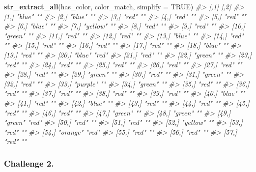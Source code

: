 \documentclass[
]{book}
\newenvironment{Shaded}{\begin{snugshade}}{\end{snugshade}}
\newcommand{\CommentTok}[1]{\textcolor[rgb]{0.56,0.35,0.01}{\textit{#1}}}
\newcommand{\DataTypeTok}[1]{\textcolor[rgb]{0.13,0.29,0.53}{#1}}
\newcommand{\KeywordTok}[1]{\textcolor[rgb]{0.13,0.29,0.53}{\textbf{#1}}}
\newcommand{\NormalTok}[1]{#1}
\newcommand{\OtherTok}[1]{\textcolor[rgb]{0.56,0.35,0.01}{#1}}
\begin{document}
\begin{Shaded}
\begin{Highlighting}[]
\KeywordTok{str_extract_all}\NormalTok{(has_color, color_match, }\DataTypeTok{simplify =} \OtherTok{TRUE}\NormalTok{)}
\CommentTok{#>       [,1]     [,2] }
\CommentTok{#>  [1,] "blue"   ""   }
\CommentTok{#>  [2,] "blue"   ""   }
\CommentTok{#>  [3,] "red"    ""   }
\CommentTok{#>  [4,] "red"    ""   }
\CommentTok{#>  [5,] "red"    ""   }
\CommentTok{#>  [6,] "blue"   ""   }
\CommentTok{#>  [7,] "yellow" ""   }
\CommentTok{#>  [8,] "red"    ""   }
\CommentTok{#>  [9,] "red"    ""   }
\CommentTok{#> [10,] "green"  ""   }
\CommentTok{#> [11,] "red"    ""   }
\CommentTok{#> [12,] "red"    ""   }
\CommentTok{#> [13,] "blue"   ""   }
\CommentTok{#> [14,] "red"    ""   }
\CommentTok{#> [15,] "red"    ""   }
\CommentTok{#> [16,] "red"    ""   }
\CommentTok{#> [17,] "red"    ""   }
\CommentTok{#> [18,] "blue"   ""   }
\CommentTok{#> [19,] "red"    ""   }
\CommentTok{#> [20,] "blue"   "red"}
\CommentTok{#> [21,] "red"    ""   }
\CommentTok{#> [22,] "green"  ""   }
\CommentTok{#> [23,] "red"    ""   }
\CommentTok{#> [24,] "red"    ""   }
\CommentTok{#> [25,] "red"    ""   }
\CommentTok{#> [26,] "red"    ""   }
\CommentTok{#> [27,] "red"    ""   }
\CommentTok{#> [28,] "red"    ""   }
\CommentTok{#> [29,] "green"  ""   }
\CommentTok{#> [30,] "red"    ""   }
\CommentTok{#> [31,] "green"  ""   }
\CommentTok{#> [32,] "red"    ""   }
\CommentTok{#> [33,] "purple" ""   }
\CommentTok{#> [34,] "green"  ""   }
\CommentTok{#> [35,] "red"    ""   }
\CommentTok{#> [36,] "red"    ""   }
\CommentTok{#> [37,] "red"    ""   }
\CommentTok{#> [38,] "red"    ""   }
\CommentTok{#> [39,] "red"    ""   }
\CommentTok{#> [40,] "blue"   ""   }
\CommentTok{#> [41,] "red"    ""   }
\CommentTok{#> [42,] "blue"   ""   }
\CommentTok{#> [43,] "red"    ""   }
\CommentTok{#> [44,] "red"    ""   }
\CommentTok{#> [45,] "red"    ""   }
\CommentTok{#> [46,] "red"    ""   }
\CommentTok{#> [47,] "green"  ""   }
\CommentTok{#> [48,] "green"  ""   }
\CommentTok{#> [49,] "green"  "red"}
\CommentTok{#> [50,] "red"    ""   }
\CommentTok{#> [51,] "red"    ""   }
\CommentTok{#> [52,] "yellow" ""   }
\CommentTok{#> [53,] "red"    ""   }
\CommentTok{#> [54,] "orange" "red"}
\CommentTok{#> [55,] "red"    ""   }
\CommentTok{#> [56,] "red"    ""   }
\CommentTok{#> [57,] "red"    ""}
\end{Highlighting}
\end{Shaded}

\hypertarget{challenge-2.-12}{%
\subsubsection*{Challenge 2.}\label{challenge-2.-12}}
\end{document}
